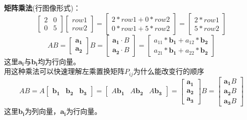 \documentclass[UTF8]{article}
\begin{document}
    \textbf{矩阵乘法}(行图像形式)：
    $$
    \begin{bmatrix}
        2 & 0 \\
        0 & 5
    \end{bmatrix}
    \begin{bmatrix}
        row1 \\
        row2
    \end{bmatrix}
    = 
    \begin{bmatrix}
        2*row1 + 0*row2 \\
        0*row1 + 5*row2
    \end{bmatrix}
    =
    \begin{bmatrix}
        2*row1 \\
        5*row2
    \end{bmatrix}
    $$
    $$
    AB =
    \begin{bmatrix}
       \bm{a_1} \\ \bm{a_2} 
    \end{bmatrix}
    B = 
    \begin{bmatrix}
        \bm{a_1} \cdot B \\ \bm{a_2} \cdot B
    \end{bmatrix}
    =
    \begin{bmatrix}
        a_{11} * \bm{b_1} + a_{12} * \bm{b_2} \\ a_{21} * \bm{b_1} + a_{22} * \bm{b_2}
    \end{bmatrix}
    $$
    这里$\bm{a_i}$与$\bm{b_i}$均为行向量。\\
    用这种乘法可以快速理解左乘置换矩阵$P_{ij}$为什么能改变行的顺序\\
    $$
    AB=A
    \begin{bmatrix}
        \bm{b_1} & \bm{b_2} & \bm{b_3}
    \end{bmatrix}
    =
    \begin{bmatrix}
        A\bm{b_1} & A\bm{b_2} & A\bm{b_3}
    \end{bmatrix}
    =
    \begin{bmatrix}
        \bm{a_1} \\ \bm{a_2} \\ \bm{a_3}
    \end{bmatrix}
    B=
    \begin{bmatrix}
        \bm{a_1}B \\ \bm{a_2}B \\ \bm{a_3}B
    \end{bmatrix}
    $$ 这里$\bm{b_i}$为列向量，$\bm{a_i}$为行向量。\\
\end{document}
